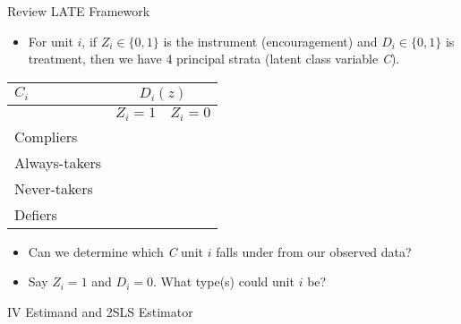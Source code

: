 \documentclass[ignorenonframetext,]{beamer}
\providecommand{\tightlist}{%
  \setlength{\itemsep}{0pt}\setlength{\parskip}{0pt}}
\begin{document}
\begin{frame}{Review LATE Framework}

\begin{itemize}[<+->]
\tightlist
\item
  For unit \(i\), if \(Z_i \in \{0, 1\}\) is the instrument
  (encouragement) and \(D_i \in \{0, 1\}\) is treatment, then we have 4
  principal strata (latent class variable \emph{C}).
\end{itemize}

\begin{center}
\begin{tabular}{l|cc}
$C_i$ & \multicolumn{2}{c}{$D_i(z)$}\\
\hline
 & $Z_i = 1$ & $Z_i = 0$\\
\hline
Compliers & \color{blue}{1} & \color{blue}{0}\\
Always-takers  & \color{blue}{1} & \color{blue}{1} \\
Never-takers & \color{blue}{0} & \color{blue}{0} \\
Defiers & \color{blue}{0} & \color{blue}{1}
\end{tabular}
\end{center}

\begin{itemize}[<+->]
\tightlist
\item
  Can we determine which \emph{C} unit \(i\) falls under from our
  observed data?
\item
  Say \(Z_i = 1\) and \(D_i = 0\). What type(s) could unit \(i\) be?
\end{itemize}

\end{frame}

\begin{frame}{IV Estimand and 2SLS Estimator}


\end{frame}
\end{document}
